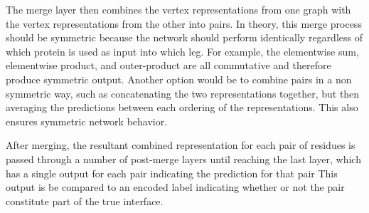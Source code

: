 The merge layer then combines the vertex representations from one graph with the vertex representations from the other into pairs. 
In theory, this merge process should be symmetric because the network should perform identically regardless of which protein is used as input into which leg.
For example, the elementwise sum, elementwise product, and outer-product are all commutative and therefore produce symmetric output.
Another option would be to combine pairs in a non symmetric way, such as concatenating the two representations together, but then averaging the predictions between each ordering of the representations.
This also ensures symmetric network behavior.

After merging, the resultant combined representation for each pair of residues is passed through a number of post-merge layers until reaching the last layer, which has a single output for each pair indicating the prediction for that pair
This output is be compared to an encoded label indicating whether or not the pair constitute part of the true interface. 


